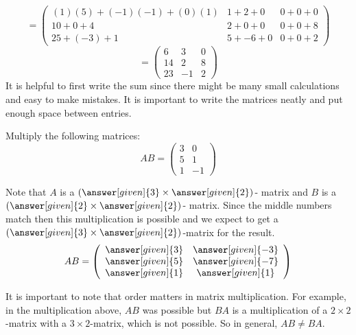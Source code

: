 \documentclass{ximera}
\begin{document}
\[= \left(\begin{array}{ccc}
(1)(5) + (-1)(-1)+ (0)(1) & 1 + 2+ 0 & 0 + 0+ 0\\
10 + 0 + 4 & 2 + 0+0 & 0 + 0+8\\
25+ (-3) + 1 & 5 + -6+0 & 0 + 0+ 2
\end{array}\right)\]
\[= \left(\begin{array}{ccc}
6 & 3 & 0\\
14& 2 & 8\\
23 & -1 & 2
\end{array}\right)
\]
It is helpful to first write the sum since there might be many small calculations and easy to make mistakes. It is important to write the matrices neatly and put enough space between entries.
\begin{question}
Multiply the following matrices:
\[AB = \left(\begin{array}{cc}
3 & 0 \\
5 & 1\\
1 & -1
\end{array}\right)
\]
\begin{prompt}
Note that $A$ is a $\left(\answer[given]{3}\times \answer[given]{2}\right)$- matrix and $B$ is a $\left(\answer[given]{2}\times \answer[given]{2}\right)$- matrix. Since the middle numbers match then this multiplication is possible and we expect to get a $\left(\answer[given]{3}\times \answer[given]{2}\right)$-matrix for the result.
\[AB = \left(\begin{array}{cc}
\answer[given]{3} & \answer[given]{-3}\\
\answer[given]{5} & \answer[given]{-7}\\
\answer[given]{1} & \answer[given]{1}
\end{array}\right)\]
\end{prompt}
\end{question}
It is important to note that order matters in matrix multiplication. For example, in the multiplication above, $AB$ was possible but $BA$ is a multiplication of a $2\times 2$-matrix with a $3\times 2$-matrix, which is not possible. So in general, $AB \neq BA$.
\end{document}
